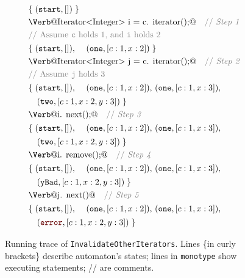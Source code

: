 \documentclass[9pt, preprint]{sigplanconf} %
\newcommand{\error}{\ensuremath{\textcolor{darkred}{\mathtt{error}}}\xspace}
\newcommand{\start}{\ensuremath{\mathtt{start}}\xspace}
\theoremstyle{definition}
\theoremstyle{remark}
\begin{document}
\begin{figure}[t]
{\def\s#1{\text{\Verb@#1@}}
 \def\m#1{\PY{n+na}{#1}}
 \def\t#1{\mathtt{#1}}
 \def\cmt#1{\textcolor{gray}{\text{// #1}}}
\begin{align*}
&\{\;(\start,[])\;\} \\
&\s{Iterator<Integer> i = c.\m{iterator}();}  \quad \cmt{\bf \it Step 1} \\
&\cmt{Assume {\tt c} holds $1$, and {\tt i} holds $2$ } \\
& \begin{aligned}
  \{\;&(\start,[]),\
      &(\t{one},[c:1,x:2])\;\}
  \end{aligned}\\
&\s{Iterator<Integer> j = c.\m{iterator}();}  \quad \cmt{\bf \it Step 2} \\
&\cmt{Assume {\tt j} holds $3$} \\
& \begin{aligned}
  \{\;&(\start,[]),\
      &(\t{one},[c:1,x:2]),\
      &(\t{one},[c:1,x:3]),\
   \end{aligned}\\
& \begin{aligned}   
      & \quad (\t{two},[c:1,x:2,y:3])\;\}
  \end{aligned}\\
&\s{i.\m{next}();} \quad \cmt{\bf \it Step 3} \\
& \begin{aligned}
  \{\;&(\start,[]),\
      &(\t{one},[c:1,x:2]),\
      &(\t{one},[c:1,x:3]),\
   \end{aligned}\\
& \begin{aligned}   
      & \quad (\t{two},[c:1,x:2,y:3])\;\}
  \end{aligned}\\
&\s{i.\m{remove}();} \quad \cmt{\bf \it Step 4}  \\
& \begin{aligned}
  \{\;&(\start,[]),\
      &(\t{one},[c:1,x:2]),\
      &(\t{one},[c:1,x:3]),\
   \end{aligned}\\
& \begin{aligned}   
      & \quad (\t{yBad},[c:1,x:2,y:3])\;\}
  \end{aligned}\\
&\s{j.\m{next}()} \quad \cmt{\bf \it Step 5}  \\
& \begin{aligned}
  \{\;&(\start,[]),\
      &(\t{one},[c:1,x:2]),\
      &(\t{one},[c:1,x:3]),\
   \end{aligned}\\
& \begin{aligned}   
      & \quad (\error,[c:1,x:2,y:3])\;\}
  \end{aligned}\\
\end{align*}}
\caption{Running trace of {\tt InvalidateOtherIterators}. Lines \{in curly brackets\} describe automaton's states;
lines in \texttt{monotype} show executing statements;
// are comments.}
\label{fig:first.steps}
\end{figure} %
\end{document}

